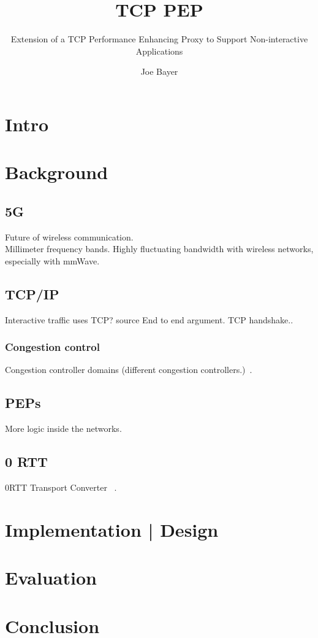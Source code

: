 \documentclass[a4paper,english, 11pt]{report}
\author{Joe Bayer}
\title{TCP PEP}
\subtitle{Extension of a TCP Performance Enhancing Proxy to
Support Non-interactive Applications}
\begin{document}
\uiomasterfp[program={Informatikk: programmering og systemarkitektur}, supervisor={Michael Welzl}]

\tableofcontents

\chapter{Intro}

\chapter{Background}

\section{5G}
Future of wireless communication.\\
Millimeter frequency bands.
Highly fluctuating bandwidth with wireless networks, especially with mmWave.\\


\section{TCP/IP}

Interactive traffic uses TCP? {source}
End to end argument.
TCP handshake..
\subsection{Congestion control}
Congestion controller domains (different congestion controllers.)~\cite{rfc5783}.

\section{PEPs}
More logic inside the networks.
\section{0 RTT}

0RTT Transport Converter ~\cite{rfc8803}.



\chapter{Implementation | Design}
\chapter{Evaluation}
\chapter{Conclusion}

{}

\end{document}
